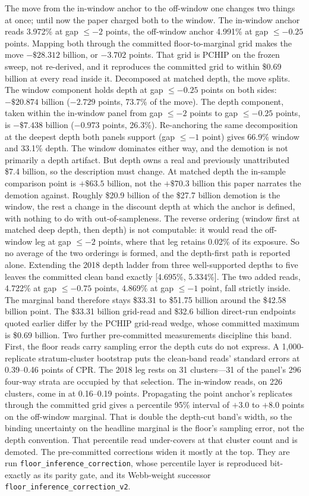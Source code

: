 \documentclass[12pt]{article}
\begin{document}
The move from the in-window anchor to the off-window one changes two things at once; until now the paper charged both to the window. The in-window anchor reads 3.972\% at gap $\leq -2$ points, the off-window anchor 4.991\% at gap $\leq -0.25$ points. Mapping both through the committed floor-to-marginal grid makes the move $-\$28.312$ billion, or $-3.702$ points. That grid is PCHIP on the frozen sweep, not re-derived, and it reproduces the committed grid to within \$0.69 billion at every read inside it. Decomposed at matched depth, the move splits. The window component holds depth at gap $\leq -0.25$ points on both sides: $-\$20.874$ billion ($-2.729$ points, 73.7\% of the move). The depth component, taken within the in-window panel from gap $\leq -2$ points to gap $\leq -0.25$ points, is $-\$7.438$ billion ($-0.973$ points, 26.3\%). Re-anchoring the same decomposition at the deepest depth both panels support (gap $\leq -1$ point) gives 66.9\% window and 33.1\% depth. The window dominates either way, and the demotion is not primarily a depth artifact. But depth owns a real and previously unattributed \$7.4 billion, so the description must change. At matched depth the in-sample comparison point is $+\$63.5$ billion, not the $+\$70.3$ billion this paper narrates the demotion against. Roughly \$20.9 billion of the \$27.7 billion demotion is the window, the rest a change in the discount depth at which the anchor is defined, with nothing to do with out-of-sampleness. The reverse ordering (window first at matched deep depth, then depth) is not computable: it would read the off-window leg at gap $\leq -2$ points, where that leg retains 0.02\% of its exposure. So no average of the two orderings is formed, and the depth-first path is reported alone. Extending the 2018 depth ladder from three well-supported depths to five leaves the committed clean band exactly [4.695\%, 5.334\%]. The two added reads, 4.722\% at gap $\leq -0.75$ points, 4.869\% at gap $\leq -1$ point, fall strictly inside. The marginal band therefore stays \$33.31 to \$51.75 billion around the \$42.58 billion point. The \$33.31 billion grid-read and \$32.6 billion direct-run endpoints quoted earlier differ by the PCHIP grid-read wedge, whose committed maximum is \$0.69 billion. Two further pre-committed measurements discipline this band. First, the floor reads carry sampling error the depth cuts do not express. A 1{,}000-replicate stratum-cluster bootstrap puts the clean-band reads' standard errors at 0.39--0.46 points of CPR. The 2018 leg rests on 31 clusters---31 of the panel's 296 four-way strata are occupied by that selection. The in-window reads, on 226 clusters, come in at 0.16--0.19 points. Propagating the point anchor's replicates through the committed grid gives a percentile 95\% interval of $+3.0$ to $+8.0$ points on the off-window marginal. That is double the depth-cut band's width, so the binding uncertainty on the headline marginal is the floor's sampling error, not the depth convention. That percentile read under-covers at that cluster count and is demoted. The pre-committed corrections widen it mostly at the top. They are run \texttt{floor\_inference\_correction}, whose percentile layer is reproduced bit-exactly as its parity gate, and its Webb-weight successor \texttt{floor\_inference\_correction\_v2}. 
\end{document}
